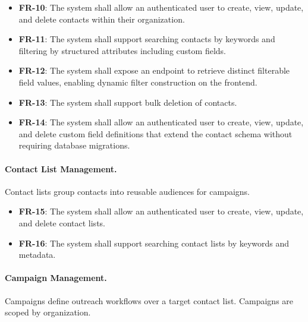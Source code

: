 \begin{itemize}
    \item \textbf{FR-10}: The system shall allow an authenticated user to create, view, update, and delete contacts within their organization.
    \item \textbf{FR-11}: The system shall support searching contacts by keywords and filtering by structured attributes including custom fields.
    \item \textbf{FR-12}: The system shall expose an endpoint to retrieve distinct filterable field values, enabling dynamic filter construction on the frontend.
    \item \textbf{FR-13}: The system shall support bulk deletion of contacts.
    \item \textbf{FR-14}: The system shall allow an authenticated user to create, view, update, and delete custom field definitions that extend the contact schema without requiring database migrations.
\end{itemize}

\paragraph{Contact List Management.}
Contact lists group contacts into reusable audiences for campaigns.

\begin{itemize}
    \item \textbf{FR-15}: The system shall allow an authenticated user to create, view, update, and delete contact lists.
    \item \textbf{FR-16}: The system shall support searching contact lists by keywords and metadata.
\end{itemize}

\paragraph{Campaign Management.}
Campaigns define outreach workflows over a target contact list. Campaigns are scoped by organization.

